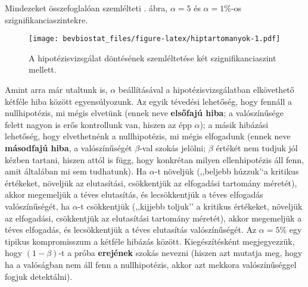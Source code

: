 \documentclass[]{book}
\begin{document}
Mindezeket összefoglalóan szemlélteti . ábra,
\(\alpha=5\) és \(\alpha=1\)\%-os szignifikanciaszintekre.

\begin{figure}
\centering
\texttt{[image: bevbiostat\_files/figure-latex/hiptartomanyok-1.pdf]}
\caption{\label{fig:hiptartomanyok}A hipotézisvizsgálat döntésének
szemléltetése két szignifikanciaszint mellett.}
\end{figure}

Amint arra már utaltunk is, \(\alpha\) beállításával a
hipotézisvizsgálatban elkövethető kétféle hiba között egyensúlyozunk. Az
egyik tévedési lehetőség, hogy fennáll a nullhipotézis, mi mégis
elvetünk (ennek neve \textbf{elsőfajú hiba}; a valószínűsége felett
nagyon is erős kontrollunk van, hiszen az épp \(\alpha\)); a másik
hibázási lehetőség, hogy elvethetnénk a nullhipotézis, mi mégis
elfogadunk (ennek neve \textbf{másodfajú hiba}, a valószínűségét
\(\beta\)-val szokás jelölni; \(\beta\) értékét nem tudjuk jól kézben
tartani, hiszen attól is függ, hogy konkrétan milyen ellenhipotézis áll
fenn, amit általában mi sem tudhatunk). Ha \(\alpha\)-t növeljük
(,,beljebb húzzuk'`a kritikus értékeket, növeljük az elutasítási,
csökkentjük az elfogadási tartomány méretét), akkor megemeljük a téves
elutasítás, és lecsökkentjük a téves elfogadás valószínűségét, ha
\(\alpha\)-t csökkentjük (,,kijjebb toljuk'' a kritikus értékeket,
növeljük az elfogadási, csökkentjük az elutasítási tartomány méretét),
akkor megemeljük a téves elfogadás, és lecsökkentjük a téves elutasítás
valószínűségét. Az \(\alpha=5\)\% egy tipikus kompromisszum a kétféle
hibázás között. Kiegészítésként megjegyezzük, hogy
\(\left(1-\beta\right)\)-t a próba \textbf{erejének} szokás nevezni
(hiszen azt mutatja meg, hogy ha a valóságban nem áll fenn a
nullhipotézis, akkor azt mekkora valószínűséggel fogjuk detektálni).
\end{document}
